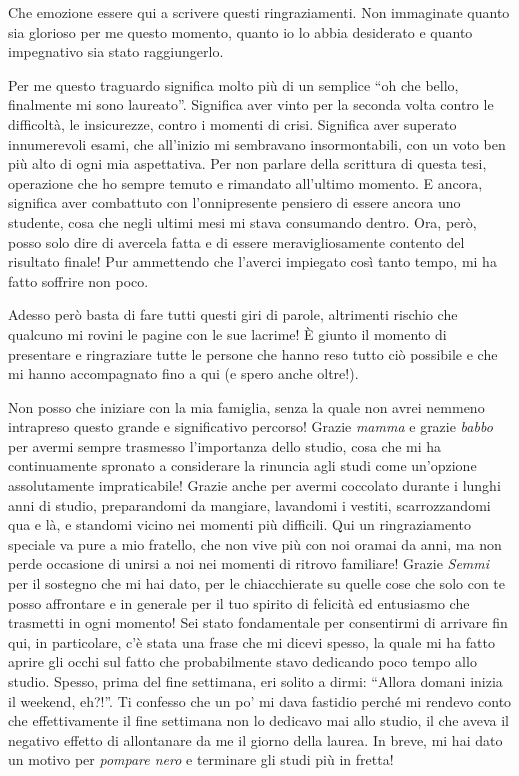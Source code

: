 \begin{acknowledgements}
  Che emozione essere qui a scrivere questi ringraziamenti.
  Non immaginate quanto sia glorioso per me questo momento, quanto io lo abbia desiderato e quanto impegnativo sia stato raggiungerlo.

  Per me questo traguardo significa molto più di un semplice ``oh che bello, finalmente mi sono laureato''.
  Significa aver vinto per la seconda volta contro le difficoltà, le insicurezze, contro i momenti di crisi.
  Significa aver superato innumerevoli esami, che all'inizio mi sembravano insormontabili, con un voto ben più alto di ogni mia aspettativa.
  Per non parlare della scrittura di questa tesi, operazione che ho sempre temuto e rimandato all'ultimo momento.
  E ancora, significa aver combattuto con l'onnipresente pensiero di essere ancora uno studente, cosa che negli ultimi mesi mi stava consumando dentro.
  Ora, però, posso solo dire di avercela fatta e di essere meravigliosamente contento del risultato finale!
  Pur ammettendo che l'averci impiegato così tanto tempo, mi ha fatto soffrire non poco.

  Adesso però basta di fare tutti questi giri di parole, altrimenti rischio che qualcuno mi rovini le pagine con le sue lacrime!
  È giunto il momento di presentare e ringraziare tutte le persone che hanno reso tutto ciò possibile e che mi hanno accompagnato fino a qui (e spero anche oltre!).

  Non posso che iniziare con la mia famiglia, senza la quale non avrei nemmeno intrapreso questo grande  e significativo percorso! Grazie \emph{mamma} e grazie \emph{babbo} per avermi sempre trasmesso l'importanza dello studio, cosa che mi ha continuamente spronato a considerare la rinuncia agli studi come un'opzione assolutamente impraticabile! Grazie anche per avermi coccolato durante i lunghi anni di studio, preparandomi da mangiare, lavandomi i vestiti, scarrozzandomi qua e là, e standomi vicino nei momenti più difficili. Qui un ringraziamento speciale va pure a mio fratello, che non vive più con noi oramai da anni, ma non perde occasione di unirsi a noi nei momenti di ritrovo familiare! Grazie \emph{Semmi} per il sostegno che mi hai dato, per le chiacchierate su quelle cose che solo con te posso affrontare e in generale per il tuo spirito di felicità ed entusiasmo che trasmetti in ogni momento! Sei stato fondamentale per consentirmi di arrivare fin qui, in particolare, c'è stata una frase che mi dicevi spesso, la quale mi ha fatto aprire gli occhi sul fatto che probabilmente stavo dedicando poco tempo allo studio. Spesso, prima del fine settimana, eri solito a dirmi: ``Allora domani inizia il weekend, eh?!''. Ti confesso che un po' mi dava fastidio perché mi rendevo conto che effettivamente il fine settimana non lo dedicavo mai allo studio, il che aveva il negativo effetto di allontanare da me il giorno della laurea. In breve, mi hai dato un motivo per \textit{pompare nero} e terminare gli studi più in fretta!


\end{acknowledgements}
